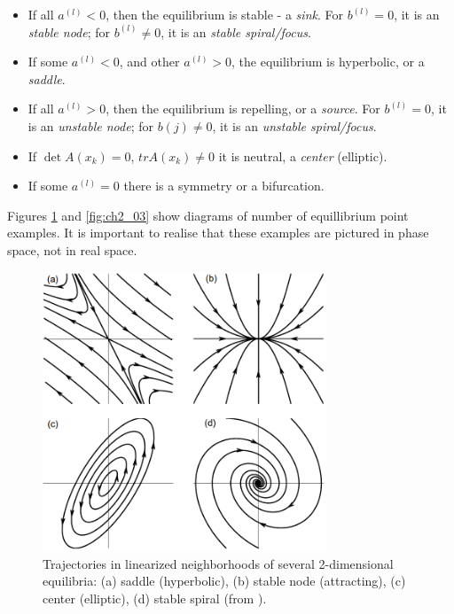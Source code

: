 \documentclass[../main.tex]{subfiles}
\begin{document}
\begin{itemize}
\item If all $a^{(l)} < 0$, then the equilibrium is stable - a \emph{sink}. For $b^{(l)} = 0$, it is an \emph{stable node}; for $b^{(l)} \neq 0$, it is an \emph{stable spiral/focus}.
\item If some $a^{(l)} < 0$, and other $a^{(l)} > 0$, the equilibrium is hyperbolic, or a \emph{saddle}.
\item If all $a^{(l)} > 0$, then the equilibrium is repelling, or a \emph{source}. For $b^{(l)} = 0$, it
is an \emph{unstable node}; for $b(j) \neq 0$, it is an \emph{unstable spiral/focus}.
\item If $\det A(x_k)=0$, $tr A(x_k) \neq 0$ it is neutral, a \emph{center} (elliptic).
\item If some $a^{(l)} = 0$ there is a symmetry or a bifurcation.
\end{itemize}
Figures \ref{fig:ch2_02} and \ref{fig:ch2_03} show diagrams of number of equillibrium point examples. It is important to realise that these examples are pictured in phase space, not in real space.
\begin{figure}
\centering
\noindent \includegraphics[width=20pc]{gfx/eq_stability_2D.png}
\caption{Trajectories in linearized neighborhoods
of several 2-dimensional equilibria: (a) saddle (hyperbolic), (b) stable node (attracting), (c) center (elliptic), (d) stable spiral (from \citet{ChaosBook}).}
\label{fig:ch2_02}
\end{figure}
\end{document}
